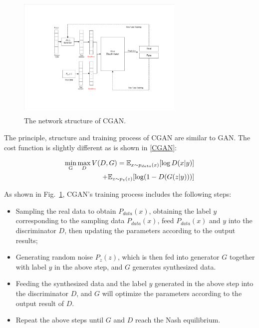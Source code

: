 \documentclass[conference]{IEEEtran}
\begin{document}
\begin{figure}[htbp]
	\centerline{\includegraphics[width=8cm, height=6cm]{fig/CGAN-20191017.pdf}}
	\caption{The network structure of CGAN.}
	\label{fig_cgan}
\end{figure}

The principle, structure and training process of CGAN are similar to GAN. The cost function is slightly different as is shown in \eqref{CGAN}:

\begin{equation}
\begin{split}
\label{CGAN}
\mathop {\min }\limits_{\rm{G}} \mathop {\max }\limits_D V(D,G) = \mathbb{E}_{x\sim{p_{data}}(x)}[\log D(x|y)] \\
+ {\mathbb{E}_{z\sim{p_z}(z)}}[\log (1 - D(G(z|y)))]
\end{split}
\end{equation}

As shown in Fig.~\ref{fig_cgan}, CGAN's training process includes the following steps:
\begin{itemize}
	\item Sampling the real data to obtain $P_{data}(x)$, obtaining the label $y$ corresponding to the sampling data $P_{data}(x)$, feed $P_{data}(x)$ and $y$ into the discriminator $D$, then updating the parameters according to the output results;
	\item Generating random noise $P_z(z)$, which is then fed into generator $G$ together with label $y$ in the above step, and $G$ generates synthesized data.
	\item Feeding the synthesized data and the label $y$ generated in the above step into the discriminator $D$, and $G$ will optimize the parameters according to the output result of $D$.
	\item Repeat the above steps until $G$ and $D$ reach the Nash equilibrium.
\end{itemize}
\end{document}
